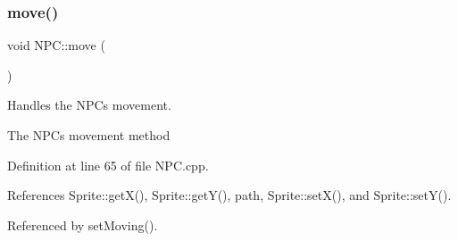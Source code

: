 \subsubsection{\texorpdfstring{move()}{move()}}
{\footnotesize\ttfamily void N\+P\+C\+::move (\begin{DoxyParamCaption}{ }\end{DoxyParamCaption})}



Handles the N\+P\+Cs movement. 

The N\+P\+Cs movement method 

Definition at line 65 of file N\+P\+C.\+cpp.



References Sprite\+::get\+X(), Sprite\+::get\+Y(), path, Sprite\+::set\+X(), and Sprite\+::set\+Y().



Referenced by set\+Moving().


